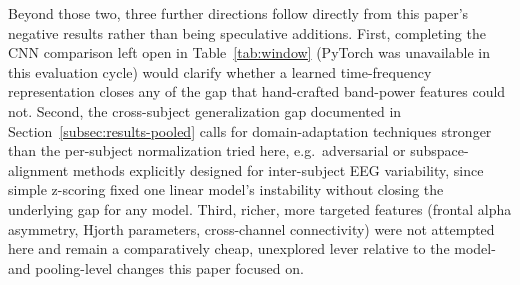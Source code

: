 \documentclass[conference]{IEEEtran}
\begin{document}
Beyond those two, three further directions follow directly from this
paper's negative results rather than being speculative additions. First,
completing the CNN comparison left open in Table~\ref{tab:window}
(PyTorch was unavailable in this evaluation cycle) would clarify whether
a learned time-frequency representation closes any of the gap that
hand-crafted band-power features could not. Second, the cross-subject
generalization gap documented in Section~\ref{subsec:results-pooled}
calls for domain-adaptation techniques stronger than the per-subject
normalization tried here, e.g.\ adversarial or subspace-alignment methods
explicitly designed for inter-subject EEG variability, since simple
z-scoring fixed one linear model's instability without closing the
underlying gap for any model. Third, richer, more targeted features
(frontal alpha asymmetry, Hjorth parameters, cross-channel connectivity)
were not attempted here and remain a comparatively cheap, unexplored
lever relative to the model- and pooling-level changes this paper
focused on.



\end{document}

